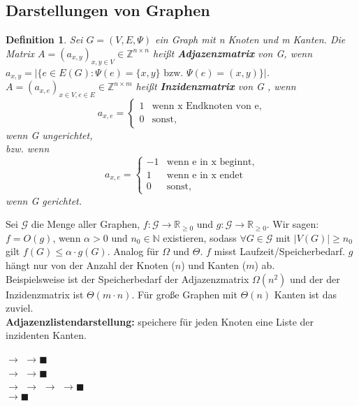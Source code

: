 \documentclass[12pt,a4paper]{article}
\theoremstyle{plain}
\newtheorem{Definition}[Theorem]{Definition}
\newcommand{\herv}[1]{{\emph{\textbf{#1}}}}
\newcommand{\N}{\mathbb{N}}
\newcommand{\R}{\mathbb{R}}
\newcommand{\Z}{\mathbb{Z}}
\numberwithin{equation}{section}
\begin{document}
\subsection{Darstellungen von Graphen}
\begin{Definition}
Sei $G=(V,E,\Psi)$ ein Graph mit n Knoten und m Kanten. Die Matrix $A=(a_{x,y})_{x,y\in V}\in \Z^{n\times n}$ heißt \herv{Adjazenzmatrix} von G, wenn \\
$a_{x,y}=|\{e\in E(G): \Psi(e)=\{x,y\}\text{ bzw. }\Psi(e)=(x,y)\}|$.\\
$A=(a_{x,e})_{x\in V, e\in E}\in \Z^{n\times m}$ heißt \herv{Inzidenzmatrix} von G , wenn \[a_{x,e}=\left\lbrace\begin{array}{ll}
1 & \text{wenn x Endknoten von e,} \\
0 & \text{sonst},
\end{array} \right.\]
wenn G ungerichtet,\\
bzw. wenn \[a_{x,e}=\left\lbrace\begin{array}{ll}
-1 & \text{wenn e in x beginnt,} \\
1 & \text{wenn e in x endet}\\
0 & \text{sonst},
\end{array} \right.\]
wenn G gerichtet.
\end{Definition} 
Sei $\mathcal{G}$ die Menge aller Graphen, $f:\mathcal{G} \rightarrow \R_{\geq 0}$ und $g:\mathcal{G}\rightarrow \R_{\geq 0}$. Wir sagen: $f=O(g)$, wenn $\alpha > 0$ und $n_0\in \N$ existieren, sodass $\forall G\in \mathcal{G}$ mit $|V(G)|\geq n_0$ gilt $f(G)\leq \alpha\cdot g(G)$. Analog für $\Omega$ und $\Theta$.
$f$ misst Laufzeit/Speicherbedarf. $g$ hängt nur von der Anzahl der Knoten ($n$) und Kanten ($m$) ab.\\
Beispielsweise ist der Speicherbedarf der Adjazenzmatrix $\Omega(n^2)$ und der der Inzidenzmatrix ist $\Theta(m\cdot n)$. Für große Graphen mit $\Theta(n)$ Kanten ist das zuviel.\\
\textbf{Adjazenzlistendarstellung:} speichere für jeden Knoten eine Liste der inzidenten Kanten.\\
\begin{minipage}{0.33\textwidth}
\vspace*{0.1cm}
 $\rightarrow$  $\rightarrow \blacksquare$\\
 $\rightarrow$  $\rightarrow \blacksquare$ \\
 $\rightarrow$  $\rightarrow$  $\rightarrow$  $\rightarrow \blacksquare$ \\
 $\rightarrow \blacksquare$
\vspace*{0.1cm}
\end{minipage}
\end{document}
